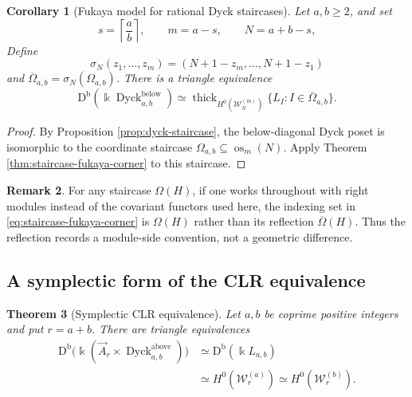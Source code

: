 \documentclass[12pt,a4paper,english,reqno]{amsart}
\theoremstyle{plain}
\newtheorem{theorem}{Theorem}[section]
\newtheorem{corollary}[theorem]{Corollary}
\theoremstyle{definition}
\newtheorem{remark}[theorem]{Remark}
\newcommand{\kk}{\Bbbk}
\newcommand{\Db}{\mathrm D^{\mathrm b}}
\newcommand{\thick}{\operatorname{thick}}
\newcommand{\Dyck}{\operatorname{Dyck}}
\newcommand{\os}{\operatorname{os}}
\newcommand{\Wcat}{\mathcal W}
\begin{document}
\begin{corollary}[Fukaya model for rational Dyck staircases]
\label{thm:dyck-fukaya-corner}
Let $a,b\geq2$, and set
\begin{equation}
 s=\left\lceil\frac ab\right\rceil,\qquad
 m=a-s,\qquad N=a+b-s,
\label{eq:fukaya-local-indices}
\end{equation}
Define
\begin{equation}
 \sigma_N(z_1,\ldots,z_m)
 =
 (N+1-z_m,\ldots,N+1-z_1)
\label{eq:sigma-local}
\end{equation}
and $\overline\Omega_{a,b}=\sigma_N(\Omega_{a,b})$.  There is a triangle
equivalence
\begin{equation}
 \Db(\kk\Dyck^{\mathrm{below}}_{a,b})
 \simeq
 \thick_{H^0(\Wcat_N^{(m)})}
 \{L_I:I\in\overline\Omega_{a,b}\}.
\label{eq:dyck-fukaya-corner}
\end{equation}
\end{corollary}

\begin{proof}
By Proposition \ref{prop:dyck-staircase}, the below-diagonal Dyck poset is
isomorphic to the coordinate staircase $\Omega_{a,b}\subseteq\os_m(N)$.
Apply Theorem \ref{thm:staircase-fukaya-corner} to this staircase.
\end{proof}

\begin{remark}
\label{rem:corner-convention}
For any staircase $\Omega(H)$, if one works throughout with right modules
instead of the covariant functors used here, the indexing set in
\eqref{eq:staircase-fukaya-corner} is $\Omega(H)$ rather than its reflection
$\overline\Omega(H)$.  Thus the reflection records a module-side convention,
not a geometric difference.
\end{remark}

\subsection{A symplectic form of the CLR equivalence}

\begin{theorem}[Symplectic CLR equivalence]
\label{thm:symplectic-CLR}
Let $a,b$ be coprime positive integers and put $r=a+b$.  There are
triangle equivalences
\begin{equation}
\begin{split}
 \Db\!\bigl(
 \kk(\vec A_r\times\Dyck^{\mathrm{above}}_{a,b})
 \bigr)
 &\simeq\Db(\kk L_{a,b})\\
 &\simeq H^0(\Wcat_r^{(a)})
 \simeq H^0(\Wcat_r^{(b)}).
\end{split}
\label{eq:symplectic-CLR}
\end{equation}
\end{theorem}
\end{document}
